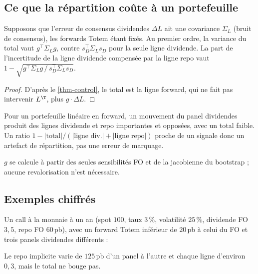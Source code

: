 \subsection{Ce que la répartition coûte à un portefeuille}
\begin{proposition}\label{prop-materiality}
Supposons que l'erreur de consensus dividendes $\Delta L$ ait une covariance $\Sigma_L$ (bruit de consensus), les forwards
Totem étant fixés. Au premier ordre, la variance du total vaut $g^\top\Sigma_Lg$, contre $s_D^\top\Sigma_Ls_D$ pour la
seule ligne dividende. La part de l'incertitude de la ligne dividende compensée par la ligne repo vaut
$1-\sqrt{g^\top\Sigma_Lg\,/\,s_D^\top\Sigma_Ls_D}$.
\end{proposition}
\begin{proof}
D'après le \cref{thm-control}, le total est la ligne forward, qui ne fait pas intervenir $L^\T$, plus $g\cdot\Delta L$.
\end{proof}

\begin{corollary}
Pour un portefeuille linéaire en forward, un mouvement du panel dividendes produit des lignes dividende et repo
importantes et opposées, avec un total faible. Un ratio $1-|\text{total}|/(|\text{ligne div.}|+|\text{ligne repo}|)$
proche de un signale donc un artefact de répartition, pas une erreur de marquage.
\end{corollary}

$g$ se calcule à partir des seules sensibilités FO et de la jacobienne du bootstrap ; aucune revalorisation n'est
nécessaire.

\subsection{Exemples chiffrés}
\begin{example}[Un call]\label{ex-call}
Un call à la monnaie à un an (spot $100$, taux $3\,\%$, volatilité $25\,\%$, dividende FO $3{,}5$, repo FO $60$\,pb),
avec un forward Totem inférieur de $20$\,pb à celui du FO et trois panels dividendes différents :
\begin{center}\end{center}
Le repo implicite varie de $125$\,pb d'un panel à l'autre et chaque ligne d'environ $0{,}3$, mais le total ne bouge pas.
\end{example}

